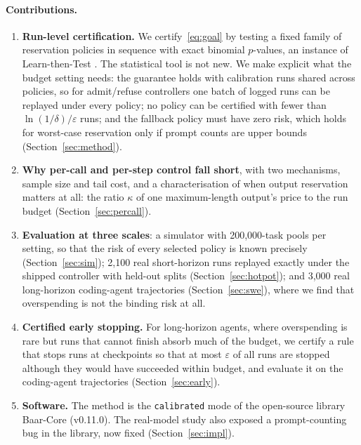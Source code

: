 \documentclass[11pt]{article}
\theoremstyle{remark}
\begin{document}
\paragraph{Contributions.}
\begin{enumerate}
  \item \textbf{Run-level certification.} We certify~\eqref{eq:goal} by testing
  a fixed family of reservation policies in sequence with exact binomial
  $p$-values, an instance of Learn-then-Test \citep{angelopoulos2021ltt}. The
  statistical tool is not new. We make explicit what the budget setting needs:
  the guarantee holds with calibration runs shared across policies, so for
  admit/refuse controllers one batch of logged runs can be replayed under
  every policy; no policy can be certified with fewer than
  $\ln(1/\delta)/\varepsilon$ runs; and the fallback policy must have zero
  risk, which holds for worst-case reservation only if prompt counts are
  upper bounds (Section~\ref{sec:method}).
  \item \textbf{Why per-call and per-step control fall short}, with two
  mechanisms, sample size and tail cost, and a characterisation of when output
  reservation matters at all: the ratio $\kappa$ of one maximum-length output's
  price to the run budget (Section~\ref{sec:percall}).
  \item \textbf{Evaluation at three scales}: a simulator with 200{,}000-task
  pools per setting, so that the risk of every selected policy is known
  precisely (Section~\ref{sec:sim}); 2{,}100 real short-horizon runs replayed
  exactly under the shipped controller with held-out splits
  (Section~\ref{sec:hotpot}); and 3{,}000 real long-horizon coding-agent
  trajectories (Section~\ref{sec:swe}), where we find that overspending is not
  the binding risk at all.
  \item \textbf{Certified early stopping.} For long-horizon agents, where
  overspending is rare but runs that cannot finish absorb much of the budget, we
  certify a rule that stops runs at checkpoints so that at most
  $\varepsilon$ of all runs are stopped although they would have succeeded
  within budget, and evaluate it on the coding-agent trajectories
  (Section~\ref{sec:early}).
  \item \textbf{Software.} The method is the \texttt{calibrated} mode of the
  open-source library Baar-Core (v0.11.0). The real-model study also exposed a
  prompt-counting bug in the library, now fixed (Section~\ref{sec:impl}).
\end{enumerate}
\end{document}

